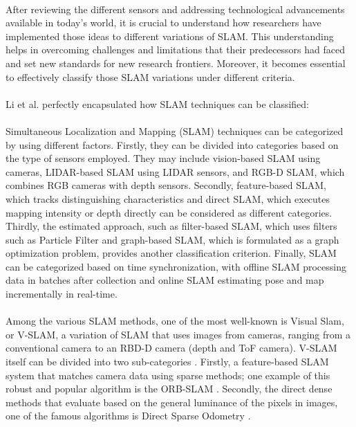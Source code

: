 \paragraph*{}
After reviewing the different sensors and addressing technological advancements available in today’s world, it is crucial to understand how researchers have implemented those ideas to different variations of SLAM. This understanding helps in overcoming challenges and limitations that their predecessors had faced and set new standards for new research frontiers. Moreover, it becomes essential to effectively classify those SLAM variations under different criteria.

\paragraph*{}
Li et al.\cite{li2024object} perfectly encapsulated how SLAM techniques can be classified: 

\paragraph*{}
Simultaneous Localization and Mapping (SLAM) techniques can be categorized by using different factors. Firstly, they can be divided into categories based on the type of sensors employed. They may include vision-based SLAM using cameras, LIDAR-based SLAM using LIDAR sensors, and RGB-D SLAM, which combines RGB cameras with depth sensors. Secondly, feature-based SLAM, which tracks distinguishing characteristics and direct SLAM, which executes mapping intensity or depth directly can be considered as different categories. Thirdly, the estimated approach, such as filter-based SLAM, which uses filters such as Particle Filter and graph-based SLAM, which is formulated as a graph optimization problem, provides another classification criterion. Finally, SLAM can be categorized based on time synchronization, with offline SLAM processing data in batches after collection and online SLAM estimating pose and map incrementally in real-time.

\paragraph*{}
Among the various SLAM methods, one of the most well-known is Visual Slam, or V-SLAM, a variation of SLAM that uses images from cameras, ranging from a conventional camera to an RBD-D camera (depth and ToF camera). V-SLAM itself can be divided into two sub-categories \cite{benkis2024survey}. Firstly, a feature-based SLAM system that matches camera data using sparse methods; one example of this robust and popular algorithm is the ORB-SLAM \cite{mur2015orb}. Secondly, the direct dense methods that evaluate based on the general luminance of the pixels in images, one of the famous algorithms is Direct Sparse Odometry \cite{engel2018direct}.

